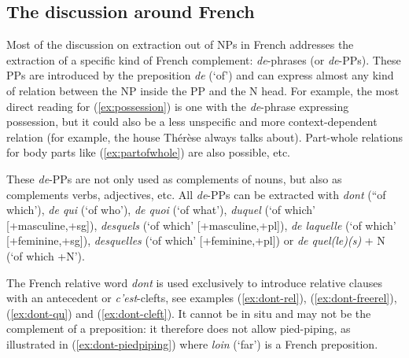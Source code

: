 \subsection{The discussion around French}
\label{ch:intro-disscussion-French}

Most of the discussion on extraction out of NPs in French addresses the extraction of a specific kind of French complement: \emph{de}-phrases (or \emph{de}-PPs). These PPs are introduced by the preposition \emph{de} (`of') and can express almost any kind of relation between the NP inside the PP and the N head. For example, the most direct reading for (\ref{ex:possession}) is one with the \emph{de}-phrase expressing possession, but it could also be a less unspecific and more context-dependent relation (for example, the house Thérèse always talks about). Part-whole relations for body parts like (\ref{ex:partofwhole}) are also possible, etc.

\eal
{}
\zl 

These \emph{de}-PPs are not only used as complements of nouns, but also as complements verbs, adjectives, etc. All \emph{de}-PPs can be extracted with \emph{dont} (``of which'), \emph{de qui} (`of who'), \emph{de quoi} (`of what'), \emph{duquel} (`of which' [+masculine,+sg]), \emph{desquels} (`of which' [+masculine,+pl]), \emph{de laquelle} (`of which' [+feminine,+sg]), \emph{desquelles} (`of which' [+feminine,+pl]) or \emph{de quel(le)(s)} + N (`of which +N').

The French relative word \emph{dont} is used exclusively to introduce relative clauses with an antecedent or \emph{c'est}-clefts, see examples (\ref{ex:dont-rel}), (\ref{ex:dont-freerel}), (\ref{ex:dont-qu}) and (\ref{ex:dont-cleft}). It cannot be in situ and may not be the complement of a preposition: it therefore does not allow pied-piping, as illustrated in (\ref{ex:dont-piedpiping}) where \emph{loin} (`far') is a French preposition.

